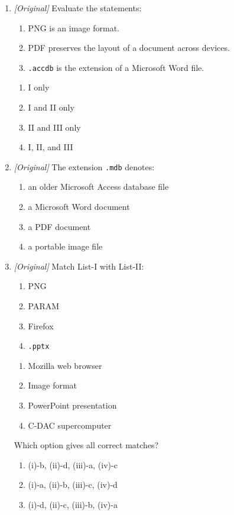 \begin{enumerate}[label=\textbf{Q\arabic*.}, leftmargin=*]
\item \textit{[Original]} Evaluate the statements:
  \begin{enumerate}[label=\Roman*.]
    \item PNG is an image format.
    \item PDF preserves the layout of a document across devices.
    \item \texttt{.accdb} is the extension of a Microsoft Word file.
  \end{enumerate}
  \begin{enumerate}[label=\Alph*.]
    \item I only
    \item I and II only
    \item II and III only
    \item I, II, and III
  \end{enumerate}
\item \textit{[Original]} The extension \texttt{.mdb} denotes:
  \begin{enumerate}[label=\Alph*.]
    \item an older Microsoft Access database file
    \item a Microsoft Word document
    \item a PDF document
    \item a portable image file
  \end{enumerate}
\item \textit{[Original]} Match List-I with List-II:
  \begin{enumerate}[label=(\roman*)]
    \item PNG
    \item PARAM
    \item Firefox
    \item \texttt{.pptx}
  \end{enumerate}
  \begin{enumerate}[label=(\alph*)]
    \item Mozilla web browser
    \item Image format
    \item PowerPoint presentation
    \item C-DAC supercomputer
  \end{enumerate}
  Which option gives all correct matches?
  \begin{enumerate}[label=\Alph*.]
    \item (i)-b, (ii)-d, (iii)-a, (iv)-c
    \item (i)-a, (ii)-b, (iii)-c, (iv)-d
    \item (i)-d, (ii)-c, (iii)-b, (iv)-a

\end{enumerate}
\end{enumerate}
